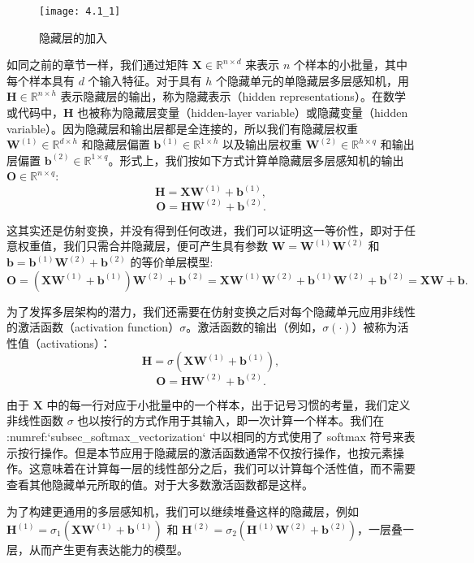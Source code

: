 \documentclass[UTF8]{ctexart}
\begin{document}
	\begin{figure}[H]
		\centering
		\texttt{[image: 4.1\_1]}
		\caption{隐藏层的加入}
		\label{fig:1}
	\end{figure}
	
	如同之前的章节一样，我们通过矩阵 $\bm{X} \in \mathbb{R}^{n \times d}$ 来表示 $n$ 个样本的小批量，其中每个样本具有 $d$ 个输入特征。对于具有 $h$ 个隐藏单元的单隐藏层多层感知机，用 $\bm{H} \in \mathbb{R}^{n \times h}$ 表示隐藏层的输出，称为隐藏表示（hidden representations）。在数学或代码中，$\bm{H}$ 也被称为隐藏层变量（hidden-layer variable）或隐藏变量（hidden variable）。因为隐藏层和输出层都是全连接的，所以我们有隐藏层权重 $\bm{W}^{(1)} \in \mathbb{R}^{d \times h}$ 和隐藏层偏置 $\bm{b}^{(1)} \in \mathbb{R}^{1 \times h}$ 以及输出层权重 $\bm{W}^{(2)} \in \mathbb{R}^{h \times q}$ 和输出层偏置 $\bm{b}^{(2)} \in \mathbb{R}^{1 \times q}$。形式上，我们按如下方式计算单隐藏层多层感知机的输出 $\bm{O} \in \mathbb{R}^{n \times q}$:
	$$
	\bm{H} = \bm{X} \bm{W}^{(1)} + \bm{b}^{(1)},
	$$
	$$
	\bm{O} = \bm{H} \bm{W}^{(2)} + \bm{b}^{(2)}.
	$$
	
	这其实还是仿射变换，并没有得到任何改进，我们可以证明这一等价性，即对于任意权重值，我们只需合并隐藏层，便可产生具有参数 $\bm{W} = \bm{W}^{(1)} \bm{W}^{(2)}$ 和 $\bm{b} = \bm{b}^{(1)} \bm{W}^{(2)} + \bm{b}^{(2)}$ 的等价单层模型:
	$$
	\bm{O} = (\bm{X} \bm{W}^{(1)} + \bm{b}^{(1)}) \bm{W}^{(2)} + \bm{b}^{(2)} = \bm{X} \bm{W}^{(1)} \bm{W}^{(2)} + \bm{b}^{(1)} \bm{W}^{(2)} + \bm{b}^{(2)} = \bm{X} \bm{W} + \bm{b}.
	$$
	
	为了发挥多层架构的潜力，我们还需要在仿射变换之后对每个隐藏单元应用非线性的激活函数（activation function）$\sigma$。激活函数的输出（例如，$\sigma(\cdot)$）被称为活性值（activations）：
	$$
	\bm{H} = \sigma(\bm{X} \bm{W}^{(1)} + \bm{b}^{(1)}),
	$$
	$$
	\bm{O} = \bm{H} \bm{W}^{(2)} + \bm{b}^{(2)}.
	$$
	
	由于 $\bm{X}$ 中的每一行对应于小批量中的一个样本，出于记号习惯的考量，我们定义非线性函数 $\sigma$ 也以按行的方式作用于其输入，即一次计算一个样本。我们在 :numref:`subsec\_softmax\_vectorization` 中以相同的方式使用了 softmax 符号来表示按行操作。但是本节应用于隐藏层的激活函数通常不仅按行操作，也按元素操作。这意味着在计算每一层的线性部分之后，我们可以计算每个活性值，而不需要查看其他隐藏单元所取的值。对于大多数激活函数都是这样。
	
	为了构建更通用的多层感知机，我们可以继续堆叠这样的隐藏层，例如 $\bm{H}^{(1)} = \sigma_1(\bm{X} \bm{W}^{(1)} + \bm{b}^{(1)})$ 和 $\bm{H}^{(2)} = \sigma_2(\bm{H}^{(1)} \bm{W}^{(2)} + \bm{b}^{(2)})$，一层叠一层，从而产生更有表达能力的模型。
	
\end{document}
